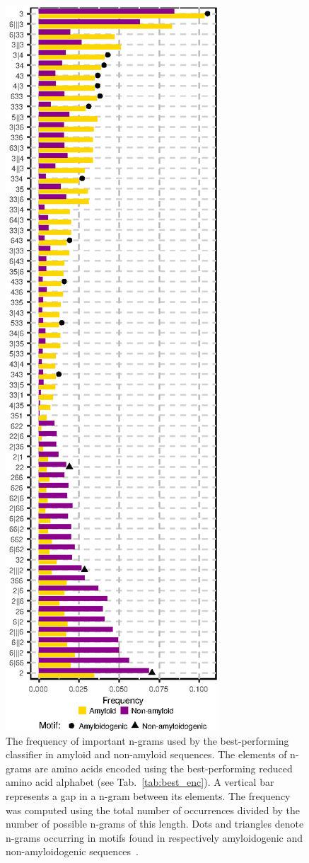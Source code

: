 \documentclass[a4,center,fleqn]{NAR}
\begin{document}
\begin{figure}[!tpb]
\centerline{\includegraphics{figures/ngrams.eps}}
\caption{The frequency of important n-grams used by the best-performing 
classifier 
in amyloid and non-amyloid sequences. The elements of n-grams 
are amino acids encoded using the best-performing reduced amino acid 
alphabet (see Tab.~\ref{tab:best_enc}). A vertical bar 
represents a gap in a n-gram between its elements. The frequency was computed using the total number of occurrences divided by the number of possible n-grams of this length.
Dots and triangles denote n-grams occurring in motifs found in respectively amyloidogenic and non-amyloidogenic sequences~\citep{paz_sequence_2004}.}\label{fig:ngrams}
\end{figure}
\end{document}
